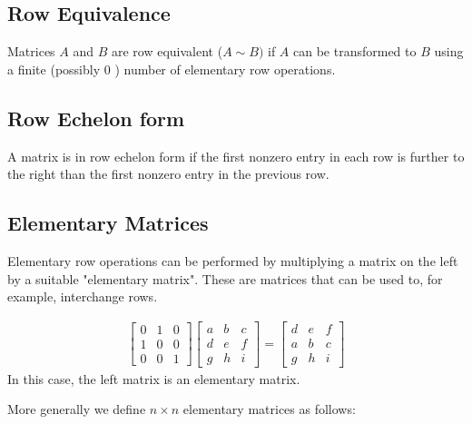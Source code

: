 \documentclass[a4paper]{article}
\theoremstyle{plain}
\theoremstyle{definition}
\newtheorem{defn}{Definition}[section]
\newtheorem{exmp}{Example}[section]
\theoremstyle{remark}
\begin{document}
\subsection{Row Equivalence}
\begin{tcolorbox}[colback=black!3!white,colframe=black!60!white,title=\begin{defn}Row Equivalence \label{Row Equivalence}\end{defn}]
Matrices $A$ and $B$ are row equivalent ($A \sim B)$ if $A$ can be transformed to $B$ using a finite (possibly $0$ ) number of elementary row operations.
\end{tcolorbox}
\subsection{Row Echelon form}
\begin{tcolorbox}[colback=black!3!white,colframe=black!60!white,title=\begin{defn}Row Echelon Form \label{Row Echelon Form}\end{defn}]
A matrix is in row echelon form if the first nonzero entry in each row is further to the right than the first nonzero entry in the previous row.
\end{tcolorbox}
\subsection{Elementary Matrices}
Elementary row operations can be performed by multiplying a matrix on the left by a suitable "elementary matrix". These are matrices that can be used to, for example, interchange rows.
\begin{tcolorbox}[colback=black!3!white,colframe=black!60!white,title=\begin{exmp}Elementary Matrix \label{Elementary Matrix}\end{exmp}]
        \begin{align}
		\begin{bmatrix} 0 & 1 & 0 \\
		1 & 0 & 0 \\
		0 & 0 & 1\end{bmatrix}  \begin{bmatrix} a & b & c \\ d & e & f \\ g & h & i \end{bmatrix} = \begin{bmatrix} d & e & f \\ a & b & c \\ g & h & i \end{bmatrix} 
        \end{align}
	In this case, the left matrix is an elementary matrix.
\end{tcolorbox}
More generally we define $n \times n$ elementary matrices as follows:
\end{document}
